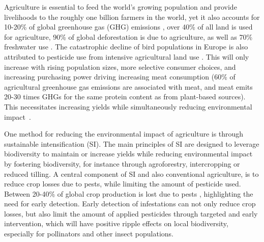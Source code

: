 Agriculture is essential to feed the world's growing  population and provide livelihoods to the roughly one billion farmers in the world, yet it also accounts for 10-20\% of  global greenhouse gas (GHG) emissions \cite{Gert-JanNabuurs2022}, over 40\% of all land is used for agriculture, 90\% of global deforestation is due to agriculture, as well as 70\% freshwater use \cite{WWF2024}. %
The catastrophic decline of bird populations in Europe is also attributed to pesticide use from intensive agricultural land use \cite{Rigal2023}.
This will only increase with rising population sizes, more selective consumer choices, and increasing purchasing power driving increasing meat consumption (60\% of agricultural greenhouse gas emissions are associated with meat, and meat emits 20-30 times GHGs for the same protein content as from plant-based sources\cite{Xu2021, Poore2018}). This necessitates increasing yields while simultaneously reducing environmental impact~\cite{McGreevy2022}.

One method for reducing the environmental impact of agriculture is through sustainable intensification (SI). The main principles of SI are designed to leverage biodiversity to maintain or increase yields while reducing environmental impact by fostering biodiversity, for instance through agroforestry, intercropping or reduced tilling. A central component of SI and also conventional agriculture, is to reduce crop losses due to pests, while limiting the amount of pesticide used. Between 20-40\% of global crop production is lost due to pests \cite{Savary2019}, highlighting the need for early detection. Early detection of infestations can not only reduce crop losses, but also limit the amount of applied pesticides through targeted and early intervention, which will have positive ripple effects on local biodiversity, especially for pollinators and other insect populations. 


